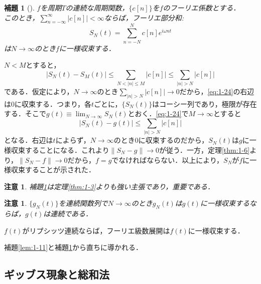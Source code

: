 \documentclass[dvipdfmx,a4j,10pt]{jsarticle}
\makeatletter
\theoremstyle{mystyle1}
\newtheorem{lemma}[theorem]{補題}
\theoremstyle{mystyle3}
\theoremstyle{mystyle4}
\newtheorem{note}{注意}[section]
\theoremstyle{mystyle6}
\theoremstyle{mystyle2}
\newtheorem{note*}{注意}
\theoremstyle{mystyle5}
\newtheorem{theorem*}{定理}
\renewenvironment{proof}[1][\proofname]{\par
  \pushQED{\qed}%
  \normalfont
  \topsep6\p@\@plus6\p@ \trivlist
  \item[\hskip\labelsep{\bfseries\sffamily #1}]\ignorespaces
}{%
  \popQED\endtrivlist\@endpefalse
}
\renewcommand\proofname{証明}
\newenvironment{lem}[1][]
{\begin{tcolorbox}[
    enhanced,
    boxrule=0pt,
    arc=0mm,
    frame hidden,
    borderline west={2pt}{-4pt}{yellow!90!black},
    breakable = true
    ]
    \begin{lemma}[#1]
}
{\end{lemma}\end{tcolorbox}}
\newenvironment{thm*}[1][]
{\begin{tcolorbox}[
    enhanced,
    boxrule=0pt,
    arc=0mm,
    frame hidden,
    borderline west={2pt}{-4pt}{red},
    breakable = true
    ]
    \begin{theorem*}[#1]
}
{\end{theorem*}\end{tcolorbox}}
\makeatother
\begin{document}
\begin{lem}\label{lem:1-12}
	$f$を周期$T$の連続な周期関数，$\{c[n]\}$を$f$のフーリエ係数とする．\\ このとき，$\sum_{n=-\infty}^\infty |c[n]|<\infty$ならば，フーリエ部分和:
	\[
		S_N(t)=\sum_{n=-N}^N c[n]e^{i\omega nt}
	\]
	は$N\to\infty$のとき$f$に一様収束する．
\end{lem}

\begin{proof}
	$N<M$とすると，
	\begin{equation}\label{eq:1-24}
		|S_N(t)-S_M(t)|\leq\sum_{N<|n|\leq M}|c[n]|\leq\sum_{|n|>N}|c[n]|
	\end{equation}
	である．仮定により，$N\to\infty$のとき$\sum_{|n|>N}|c[n]|\to 0$だから，\eqref{eq:1-24}の右辺は$0$に収束する．つまり，各$t$ごとに，$\{S_N(t)\}$はコーシー列であり，極限が存在する．そこで$g(t)\equiv\lim_{N\to\infty}S_N(t)$とおく．\eqref{eq:1-24}で$M\to\infty$とすると
	\[
		|S_N(t)-g(t)|\leq\sum_{|n|>N}|c[n]|
	\]
	となる．右辺は$t$によらず，$N\to\infty$のとき$0$に収束するのだから，$S_N(t)$は$g$に一様収束することになる．これより$\|S_N-g\|\to 0$が従う．一方，定理\ref{thm:1-6}より，$\|S_N-f\|\to 0$だから，$f=g$でなければならない．以上により，$S_N$が$f$に一様収束することが示された．
\end{proof}

\begin{note*}
	補題\ref{lem:1-12}は定理\ref{thm:1-3}よりも強い主張であり，重要である．
\end{note*}

\begin{note}
	$\{g_N(t)\}$を連続関数列で$N\to\infty$のとき$g_N(t)$は$g(t)$に一様収束するならば，$g(t)$は連続である．
\end{note}

\begin{thm*}
	$f(t)$がリプシッツ連続ならば，フーリエ級数展開は$f(t)$に一様収束する．
\end{thm*}

\begin{proof}
	補題\ref{lem:1-11}と補題\ref{lem:1-12}から直ちに導かれる．
\end{proof}

\subsection{ギッブス現象と総和法}

\end{document}
